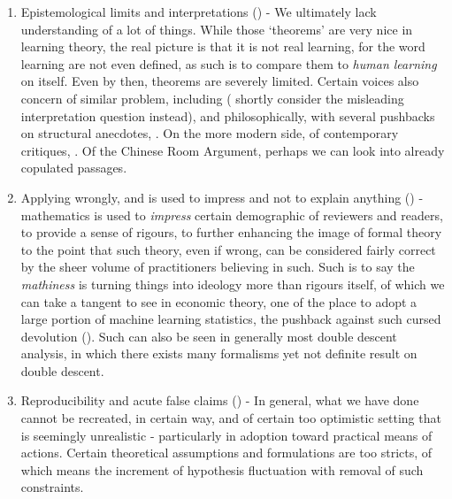 \documentclass[10pt]{article} %
\begin{document}
\begin{enumerate}[itemsep=2pt,topsep=1pt]
    \item Epistemological limits and interpretations (\cite{electronics13020416}) - We ultimately lack understanding of a lot of things. While those `theorems' are very nice in learning theory, the real picture is that it is not real learning, for the word learning are not even defined, as such is to compare them to \textit{human learning} on itself. Even by then, theorems are severely limited. Certain voices also concern of similar problem, including \cite{lipton2016mythos,doshi2017towards,molnar2020general} (\cite{molnar2020general} shortly consider the misleading interpretation question instead), and philosophically, with several pushbacks on structural anecdotes, \cite{dreyfus1965alchemy,dreyfus1972what,dreyfus1986mind,suchman1987plans,brooks1991intelligence,searle1980minds,mccarthy1969philosophical,harnad1990symbol}. On the more modern side, of contemporary critiques, \cite{pearl2009causality,marcus2018deep,sutton2019bitter}. Of the Chinese Room Argument, perhaps we can look into already copulated passages. 
    \item Applying wrongly, and is used to impress and not to explain anything (\cite{lipton2018troublingtrendsmachinelearning}) - mathematics is used to \textit{impress} certain demographic of reviewers and readers, to provide a sense of rigours, to further enhancing the image of formal theory to the point that such theory, even if wrong, can be considered fairly correct by the sheer volume of practitioners believing in such. Such is to say the \textit{mathiness} is turning things into ideology more than rigours itself, of which we can take a tangent to see in economic theory, one of the place to adopt a large portion of machine learning statistics, the pushback against such cursed devolution (\cite{romer2015mathiness,syll2024postreal}). Such can also be seen in generally most double descent analysis, in which there exists many formalisms yet not definite result on double descent. 
    \item Reproducibility and acute false claims (\cite{kapoor2022leakage}) - In general, what we have done cannot be recreated, in certain way, and of certain too optimistic setting that is seemingly unrealistic - particularly in adoption toward practical means of actions. Certain theoretical assumptions and formulations are too stricts, of which means the increment of hypothesis fluctuation with removal of such constraints. 
\end{enumerate}
\end{document}

